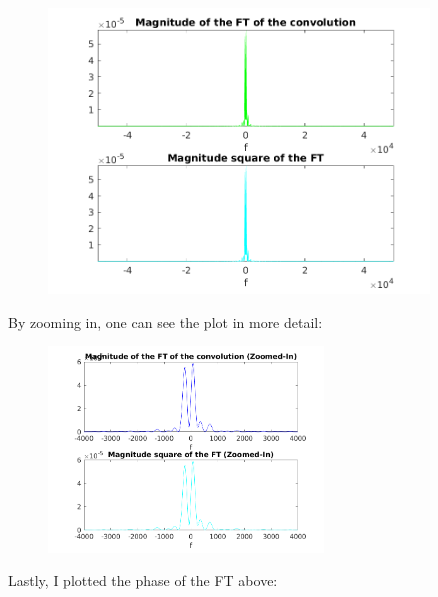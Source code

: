 \documentclass[a4paper,11pt]{article}
\begin{document}
\begin{figure}[!hp]
    \begin{center}
      \includegraphics[width=0.9\textwidth]{images/exercice_5b.png}
    \end{center}
\end{figure}

\newpage

By zooming in, one can see the plot in more detail:

\begin{figure}[!hp]
    \begin{center}
      \includegraphics[width=0.65\textwidth]{images/exercice_5b_c.png}
    \end{center}
\end{figure}

Lastly, I plotted the phase of the FT above:
\end{document}
